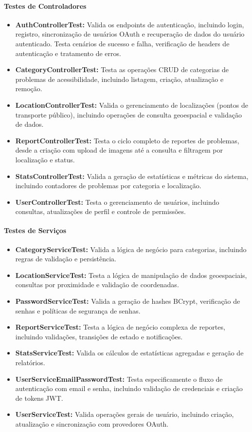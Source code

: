 \documentclass[12pt,a4paper]{article}
\begin{document}
\paragraph{Testes de Controladores}

\begin{itemize}
    \item \textbf{AuthControllerTest:} Valida os endpoints de autenticação, incluindo login, registro, sincronização de usuários OAuth e recuperação de dados do usuário autenticado. Testa cenários de sucesso e falha, verificação de headers de autenticação e tratamento de erros.
    \item \textbf{CategoryControllerTest:} Testa as operações CRUD de categorias de problemas de acessibilidade, incluindo listagem, criação, atualização e remoção.
    \item \textbf{LocationControllerTest:} Valida o gerenciamento de localizações (pontos de transporte público), incluindo operações de consulta geoespacial e validação de dados.
    \item \textbf{ReportControllerTest:} Testa o ciclo completo de reportes de problemas, desde a criação com upload de imagens até a consulta e filtragem por localização e status.
    \item \textbf{StatsControllerTest:} Valida a geração de estatísticas e métricas do sistema, incluindo contadores de problemas por categoria e localização.
    \item \textbf{UserControllerTest:} Testa o gerenciamento de usuários, incluindo consultas, atualizações de perfil e controle de permissões.
\end{itemize}

\paragraph{Testes de Serviços}

\begin{itemize}
    \item \textbf{CategoryServiceTest:} Valida a lógica de negócio para categorias, incluindo regras de validação e persistência.
    \item \textbf{LocationServiceTest:} Testa a lógica de manipulação de dados geoespaciais, consultas por proximidade e validação de coordenadas.
    \item \textbf{PasswordServiceTest:} Valida a geração de hashes BCrypt, verificação de senhas e políticas de segurança de senhas.
    \item \textbf{ReportServiceTest:} Testa a lógica de negócio complexa de reportes, incluindo validações, transições de estado e notificações.
    \item \textbf{StatsServiceTest:} Valida os cálculos de estatísticas agregadas e geração de relatórios.
    \item \textbf{UserServiceEmailPasswordTest:} Testa especificamente o fluxo de autenticação com email e senha, incluindo validação de credenciais e criação de tokens JWT.
    \item \textbf{UserServiceTest:} Valida operações gerais de usuário, incluindo criação, atualização e sincronização com provedores OAuth.
\end{itemize}
\end{document}
